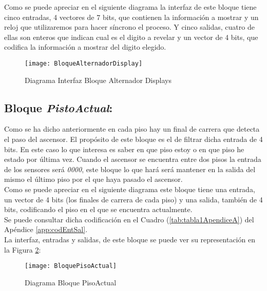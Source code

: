 	Como se puede apreciar en el siguiente diagrama la interfaz de este bloque tiene cinco entradas, 4 vectores de 7 bits, que contienen la información a mostrar  y un reloj que utilizaremos para hacer síncrono el proceso. Y cinco salidas, cuatro de ellas son enteros que indican cual es el digito a revelar y un vector de 4 bits, que codifica la información a mostrar del digito elegido.

	\begin{figure}[H]
		    \centering
		    \texttt{[image: BloqueAlternadorDisplay]}
		    \caption{Diagrama Interfaz Bloque Alternador Displays}
		    \label{fig:BloqueAlternadorDisplay}
	\end{figure}

\subsection{Bloque \textit{PistoActual}:} \label{bloque:PisoActual}
    Como se ha dicho anteriormente en cada piso hay un final de carrera que detecta el paso del ascensor. El propósito de este bloque es el de filtrar dicha entrada de 4 bits. En este caso lo que interesa es saber en que piso estoy o en que piso he estado por última vez. Cuando el ascensor se encuentra entre dos pisos la entrada de los sensores será \textit{0000}, este bloque lo que hará será mantener en la salida del mismo el último piso por el que haya pasado el ascensor. \\ 
    
    Como se puede apreciar en el siguiente diagrama este bloque tiene una entrada, un vector de 4 bits (los finales de carrera de cada piso) y una salida, también de 4 bits, codificando el piso en el que se encuentra actualmente. \\ 
    
    Se puede consultar dicha codificación en el Cuadro (\ref{tab:tabla1ApendiceA}) del Apéndice \ref{app:codEntSal}. \\ 
    
    La interfaz, entradas y salidas, de este bloque se puede ver su representación en la Figura \ref{fig:BloquePisoActual}:
    
    \begin{figure}[H]
		    \centering
		    \hspace*{-1.8cm}
		    \texttt{[image: BloquePisoActual]}
		    \caption{Diagrama Bloque PisoActual}
		    \label{fig:BloquePisoActual}
	\end{figure}
	
